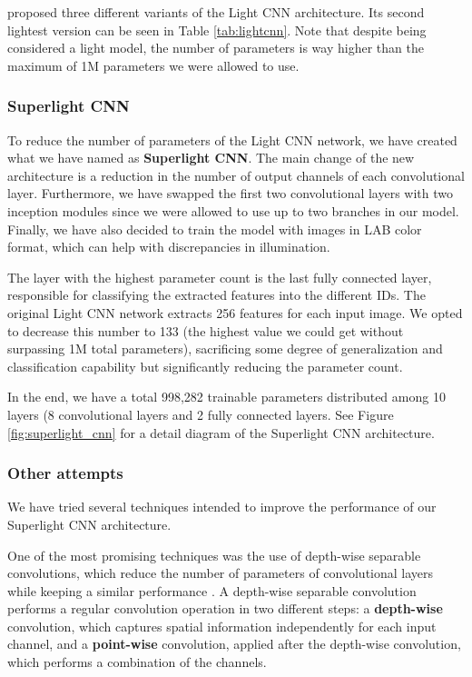 \documentclass[11pt, a4paper]{article}
\numberwithin{equation}{subsection}
\begin{document}
\citet{wu2018light} proposed three different variants of the Light CNN architecture. Its second lightest version can be seen in Table \ref{tab:lightcnn}. Note that despite being considered a light model, the number of parameters is way higher than the maximum of 1M parameters we were allowed to use.

\subsubsection{Superlight CNN}

To reduce the number of parameters of the Light CNN network, we have created what we have named as \textbf{Superlight CNN}. The main change of the new architecture is a reduction in the number of output channels of each convolutional layer. Furthermore, we have swapped the first two convolutional layers with two inception modules since we were allowed to use up to two branches in our model. Finally, we have also decided to train the model with images in LAB color format, which can help with discrepancies in illumination.

The layer with the highest parameter count is the last fully connected layer, responsible for classifying the extracted features into the different IDs. The original Light CNN network extracts 256 features for each input image. We opted to decrease this number to 133 (the highest value we could get without surpassing 1M total parameters), sacrificing some degree of generalization and classification capability but significantly reducing the parameter count.

In the end, we have a total 998,282 trainable parameters distributed among 10 layers (8 convolutional layers and 2 fully connected layers. See Figure \ref{fig:superlight_cnn} for a detail diagram of the Superlight CNN architecture.

\subsubsection{Other attempts}

We have tried several techniques intended to improve the performance of our Superlight CNN architecture. 

One of the most promising techniques was the use of depth-wise separable convolutions, which reduce the number of parameters of convolutional layers while keeping a similar performance \cite{howard-2017}. A depth-wise separable convolution performs a regular convolution operation in two different steps: a \textbf{depth-wise} convolution, which captures spatial information independently for each input channel, and a \textbf{point-wise} convolution, applied after the depth-wise convolution, which performs a combination of the channels.
\end{document}
